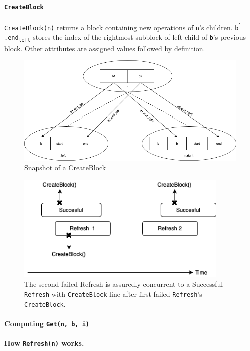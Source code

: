 \documentclass[10pt]{article}
\theoremstyle{definition}
\begin{document}
\paragraph{\texttt{CreateBlock}} \texttt{CreateBlock(n)} returns a block containing new operations of \texttt{n}'s children. \texttt{b\textsuperscript{$\prime$}.end\textsubscript{left}} stores the index of the rightmost subblock of left child of \texttt{b}'s previous block. Other attributes are assigned values followed by definition.
\begin{figure}[hbt]
  \center\includegraphics[width=5.5in]{pics/createblock}
  \caption{\label{fig::createBlock}Snapshot of a CreateBlock}
\end{figure}

\begin{figure}[hbt]
  \center\includegraphics[width=4in]{pics/doublerefresh.png}
  \caption{The second failed Refresh is assuredly concurrent to a Successful \texttt{Refresh} with \texttt{CreateBlock} line after first failed \texttt{Refresh}'s \texttt{CreateBlock}.}
\end{figure}

\paragraph{Computing \texttt{Get(n, b, i)}}

\paragraph{How \texttt{Refresh(n)} works.}
\end{document}
